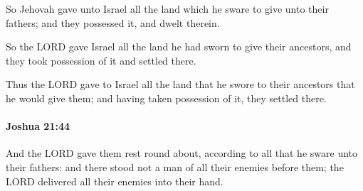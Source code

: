 			\begin{versebox}
					\item[BHS] 
					\item[ASV] So Jehovah gave unto Israel all the land which he sware to give unto their fathers; and they possessed it, and dwelt therein.
					\item[NIV] So the LORD gave Israel all the land he had sworn to give their ancestors, and they took possession of it and settled there.
					\item[NRSV] Thus the LORD gave to Israel all the land that he swore to their ancestors that he would give them; and having taken possession of it, they settled there.
			\end{versebox}

		\paragraph{Joshua 21:44} %
			\label{JOSHUA-21-44}

			And the LORD gave them rest round about, according to all that he sware unto their fathers: and there stood not a man of all their enemies before them; the LORD delivered all their enemies into their hand.

